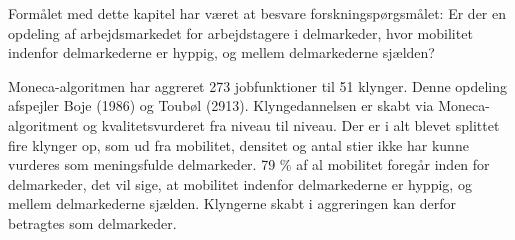 Formålet med dette kapitel har været at besvare forskningspørgsmålet: Er der en opdeling af arbejdsmarkedet for arbejdstagere i delmarkeder, hvor mobilitet indenfor delmarkederne er hyppig, og mellem delmarkederne sjælden?

Moneca-algoritmen har aggreret 273 jobfunktioner til 51 klynger. Denne opdeling afspejler Boje (1986) og Toubøl (2913). Klyngedannelsen er skabt via Moneca-algoritment og kvalitetsvurderet fra niveau til niveau. Der er i alt blevet splittet fire klynger op, som ud fra mobilitet, densitet og antal stier ikke har kunne vurderes som meningsfulde delmarkeder. 79 \% af al mobilitet foregår inden for delmarkeder, det vil sige, at mobilitet indenfor delmarkederne er hyppig, og mellem delmarkederne sjælden. Klyngerne skabt i aggreringen kan derfor betragtes som delmarkeder.



% 
% 
%
%
%
%
%
%
%
%
%
%
%
%
%
%
%
%
